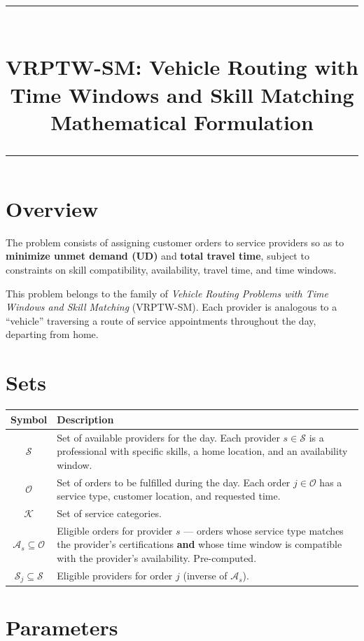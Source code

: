 \documentclass[11pt,a4paper]{article}
\title{
  \vspace{-1cm}
  {\color{accent}\rule{\linewidth}{1pt}}\\[0.5cm]
  {\LARGE\bfseries VRPTW-SM: Vehicle Routing with Time Windows and Skill Matching}\\[0.2cm]
  {\large Mathematical Formulation}\\[0.3cm]
  {\color{accent}\rule{\linewidth}{1pt}}
}
\author{}
\date{}
\begin{document}
\maketitle
\thispagestyle{empty}

\section{Overview}

The problem consists of assigning customer orders to service providers so as to \textbf{minimize unmet demand (UD)} and \textbf{total travel time}, subject to constraints on skill compatibility, availability, travel time, and time windows.

This problem belongs to the family of \textit{Vehicle Routing Problems with Time Windows and Skill Matching} (VRPTW-SM). Each provider is analogous to a ``vehicle'' traversing a route of service appointments throughout the day, departing from home.

\section{Sets}

\begin{tabular}{@{}cp{12cm}@{}}
\toprule
\textbf{Symbol} & \textbf{Description} \\
\midrule
$\mathcal{S}$ & Set of available providers for the day. Each provider $s \in \mathcal{S}$ is a professional with specific skills, a home location, and an availability window. \\[6pt]
$\mathcal{O}$ & Set of orders to be fulfilled during the day. Each order $j \in \mathcal{O}$ has a service type, customer location, and requested time. \\[6pt]
$\mathcal{K}$ & Set of service categories. \\[6pt]
$\mathcal{A}_s \subseteq \mathcal{O}$ & Eligible orders for provider $s$ --- orders whose service type matches the provider's certifications \textbf{and} whose time window is compatible with the provider's availability. Pre-computed. \\[6pt]
$\mathcal{S}_j \subseteq \mathcal{S}$ & Eligible providers for order $j$ (inverse of $\mathcal{A}_s$). \\
\bottomrule
\end{tabular}

\section{Parameters}
\end{document}
